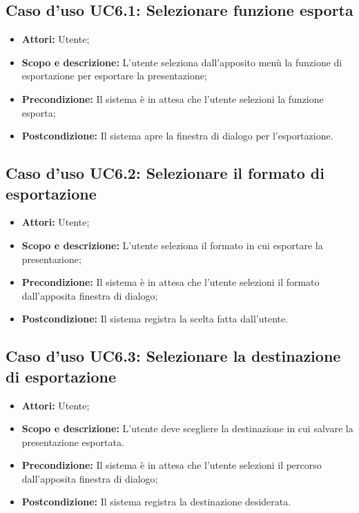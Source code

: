\subsection{Caso d'uso UC6.1: Selezionare funzione esporta}
	\begin{itemize}
		\item \textbf{Attori:} Utente;
		\item \textbf{Scopo e descrizione:} L'utente seleziona dall'apposito menù la funzione di esportazione per esportare la presentazione;
		\item \textbf{Precondizione:} Il sistema è in attesa che l'utente selezioni la funzione esporta;
		\item \textbf{Postcondizione:} Il sistema apre la finestra di dialogo per l'esportazione.
	\end{itemize}


\subsection{Caso d'uso UC6.2: Selezionare il formato di esportazione}
	\begin{itemize}
		\item \textbf{Attori:} Utente;
		\item \textbf{Scopo e descrizione:} L'utente seleziona il formato in cui esportare la presentazione;
		\item \textbf{Precondizione:} Il sistema è in attesa che l'utente selezioni il formato dall'apposita finestra di dialogo;
		\item \textbf{Postcondizione:} Il sistema registra la scelta fatta dall'utente.
	\end{itemize}


\subsection{Caso d'uso UC6.3: Selezionare la destinazione di esportazione}
	\begin{itemize}
		\item \textbf{Attori:} Utente;
		\item \textbf{Scopo e descrizione:} L'utente deve scegliere la destinazione in cui salvare la presentazione esportata.
		\item \textbf{Precondizione:} Il sistema è in attesa che l'utente selezioni il percorso dall'apposita finestra di dialogo;
		\item \textbf{Postcondizione:} Il sistema registra la destinazione desiderata.
	\end{itemize}


